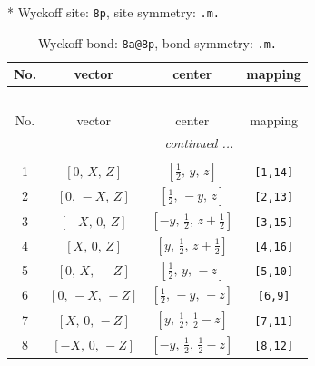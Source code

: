 \documentclass[fleqn,8pt]{jsarticle}
\begin{document}
* Wyckoff site: {\tt 8p}, site symmetry: {\tt .m.}
\renewcommand{\arraystretch}{1.2}
\begin{longtable}{cccc}
\caption{Wyckoff bond: {\tt 8a@8p}, bond symmetry: {\tt .m.}}
 \\
 \hline \hline
No. & vector & center & mapping \\ \hline \endfirsthead

\multicolumn{3}{l}{\tablename\ \thetable{}} \\
 \hline \hline
No. & vector & center & mapping \\ \hline \endhead

 \hline \hline
\multicolumn{3}{r}{\footnotesize\it continued ...} \\ \endfoot

 \hline \hline
\multicolumn{3}{r}{} \\ \endlastfoot

1 & $\left[ 0,\, X,\, Z \right]$ & $\left[ \frac{1}{2},\, y,\, z \right]$ & {\tt [1,14]} \\ \hline
2 & $\left[ 0,\, - X,\, Z \right]$ & $\left[ \frac{1}{2},\, - y,\, z \right]$ & {\tt [2,13]} \\ \hline
3 & $\left[ - X,\, 0,\, Z \right]$ & $\left[ - y,\, \frac{1}{2},\, z + \frac{1}{2} \right]$ & {\tt [3,15]} \\ \hline
4 & $\left[ X,\, 0,\, Z \right]$ & $\left[ y,\, \frac{1}{2},\, z + \frac{1}{2} \right]$ & {\tt [4,16]} \\ \hline
5 & $\left[ 0,\, X,\, - Z \right]$ & $\left[ \frac{1}{2},\, y,\, - z \right]$ & {\tt [5,10]} \\ \hline
6 & $\left[ 0,\, - X,\, - Z \right]$ & $\left[ \frac{1}{2},\, - y,\, - z \right]$ & {\tt [6,9]} \\ \hline
7 & $\left[ X,\, 0,\, - Z \right]$ & $\left[ y,\, \frac{1}{2},\, \frac{1}{2} - z \right]$ & {\tt [7,11]} \\ \hline
8 & $\left[ - X,\, 0,\, - Z \right]$ & $\left[ - y,\, \frac{1}{2},\, \frac{1}{2} - z \right]$ & {\tt [8,12]} \\
\end{longtable}
\renewcommand{\arraystretch}{1.2}
\end{document}
